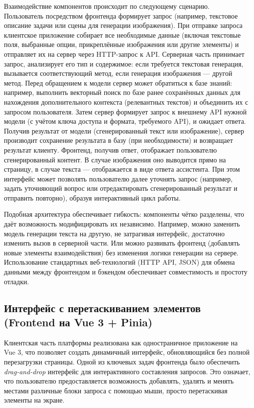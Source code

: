 Взаимодействие компонентов происходит по следующему сценарию. Пользователь посредством фронтенда формирует запрос (например, текстовое описание задачи или сцены для генерации изображения). При отправке запроса клиентское приложение собирает все необходимые данные (включая текстовые поля, выбранные опции, прикреплённые изображения или другие элементы) и отправляет их на сервер через HTTP-запрос к API. Серверная часть принимает запрос, анализирует его тип и содержимое: если требуется текстовая генерация, вызывается соответствующий метод, если генерация изображения — другой метод. Перед обращением к модели сервер может обратиться к базе знаний: например, выполнить векторный поиск по базе ранее сохранённых данных для нахождения дополнительного контекста (релевантных текстов) и объединить их с запросом пользователя. Затем сервер формирует запрос к внешнему API нужной модели (с учётом ключа доступа и формата, требуемого API), и ожидает ответа. Получив результат от модели (сгенерированный текст или изображение), сервер производит сохранение результата в базу (при необходимости) и возвращает результат клиенту. Фронтенд, получив ответ, отображает пользователю сгенерированный контент. В случае изображения оно выводится прямо на страницу, в случае текста — отображается в виде ответа ассистента. При этом интерфейс может позволять пользователю далее уточнять запрос (например, задать уточняющий вопрос или отредактировать сгенерированный результат и отправить повторно), образуя интерактивный цикл работы.

Подобная архитектура обеспечивает гибкость: компоненты чётко разделены, что даёт возможность модифицировать их независимо. Например, можно заменить модель генерации текста на другую, не затрагивая интерфейс, достаточно изменить вызов в серверной части. Или можно развивать фронтенд (добавлять новые элементы взаимодействия) без изменения логики генерации на сервере. Использование стандартных веб-технологий (HTTP API, JSON) для обмена данными между фронтендом и бэкендом обеспечивает совместимость и простоту отладки.

\subsection{Интерфейс с перетаскиванием элементов (Frontend на Vue 3 + Pinia)}

Клиентская часть платформы реализована как одностраничное приложение на Vue 3, что позволяет создать динамичный интерфейс, обновляющийся без полной перезагрузки страницы. Одной из ключевых задач фронтенда было обеспечить \textit{drag-and-drop} интерфейс для интерактивного составления запросов. Это означает, что пользователю предоставляется возможность добавлять, удалять и менять местами различные блоки запроса с помощью мыши, просто перетаскивая элементы на экране.

